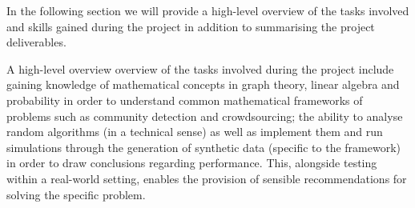 \documentclass[12pt]{article}
\numberwithin{equation}{section}
\begin{document}
In the following section we will provide a high-level overview of the tasks involved and skills gained during the project in addition to summarising the project deliverables.

A high-level overview overview of the tasks involved during the project include gaining knowledge of mathematical concepts in graph theory, linear algebra and probability in order to understand common mathematical frameworks of problems such as community detection and crowdsourcing; the ability to analyse random algorithms (in a technical sense) as well as implement them and run simulations through the generation of synthetic data (specific to the framework) in order to draw conclusions regarding performance. This, alongside testing within a real-world setting, enables the provision of sensible recommendations for solving the specific problem.
\end{document}
